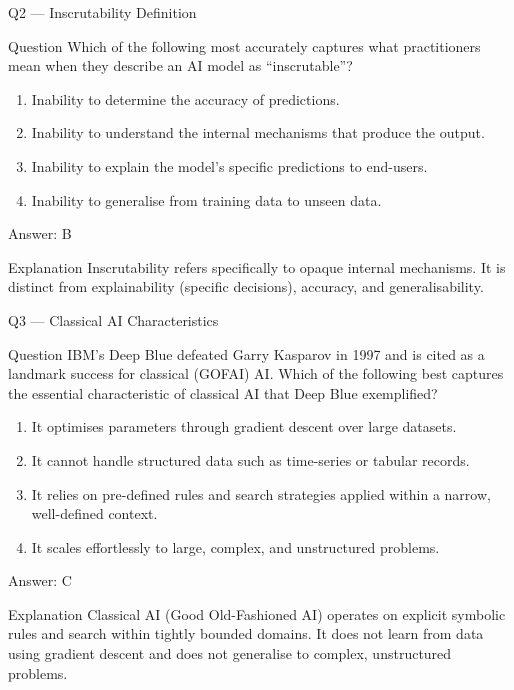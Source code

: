 \documentclass[aspectratio=169,8pt]{beamer}
\begin{document}
	\begin{frame}{Q2 --- Inscrutability Definition}
		\begin{block}{Question}
			Which of the following most accurately captures what practitioners mean when they describe an AI model as ``inscrutable''?
		\end{block}
		\begin{enumerate}
			\item Inability to determine the accuracy of predictions.
			\item Inability to understand the internal mechanisms that produce the output.
			\item Inability to explain the model's specific predictions to end-users.
			\item Inability to generalise from training data to unseen data.
		\end{enumerate}
		\begin{exampleblock}{Answer: B}\end{exampleblock}
		\begin{block}{Explanation}
			Inscrutability refers specifically to opaque internal mechanisms. It is distinct from explainability (specific decisions), accuracy, and generalisability.
		\end{block}
	\end{frame}
	
	\begin{frame}{Q3 --- Classical AI Characteristics}
		\begin{block}{Question}
			IBM's Deep Blue defeated Garry Kasparov in 1997 and is cited as a landmark success for classical (GOFAI) AI. Which of the following best captures the essential characteristic of classical AI that Deep Blue exemplified?
		\end{block}
		\begin{enumerate}
			\item It optimises parameters through gradient descent over large datasets.
			\item It cannot handle structured data such as time-series or tabular records.
			\item It relies on pre-defined rules and search strategies applied within a narrow, well-defined context.
			\item It scales effortlessly to large, complex, and unstructured problems.
		\end{enumerate}
		\begin{exampleblock}{Answer: C}\end{exampleblock}
		\begin{block}{Explanation}
			Classical AI (Good Old-Fashioned AI) operates on explicit symbolic rules and search within tightly bounded domains. It does not learn from data using gradient descent and does not generalise to complex, unstructured problems.
		\end{block}
	\end{frame}
	
\end{document}
